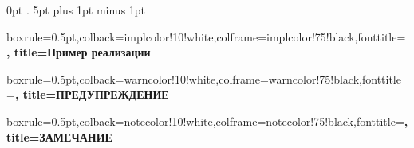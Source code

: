     {\topsep}   %
    {\topsep}   %
    {\itshape}  %
    {0pt}       %
    {\bfseries} %
    {.}         %
    {5pt plus 1pt minus 1pt} %
    {}          %

\theoremstyle{thstyle}

\newtheorem{define}{Определение}[section]
\newtheorem{example}{Пример}[section]


\newenvironment{fig}
{
    \begin{figure}[H]
    \centering
}
{
    \end{figure}
}

\newenvironment{colbox}[1]{%
   \def\FrameCommand{\colorbox{#1}}%
   \MakeFramed{\advance\hsize-\width \FrameRestore}}
 {\endMakeFramed}



{%
    boxrule=0.5pt,colback=implcolor!10!white,colframe=implcolor!75!black,fonttitle=\bfseries,
    title=Пример реализации~\thetcbcounter%
}


{%
    boxrule=0.5pt,colback=warncolor!10!white,colframe=warncolor!75!black,fonttitle=\bfseries,
    title=ПРЕДУПРЕЖДЕНИЕ~\thetcbcounter%
}



{%
    boxrule=0.5pt,colback=notecolor!10!white,colframe=notecolor!75!black,fonttitle=\bfseries,
    title=ЗАМЕЧАНИЕ~\thetcbcounter%
}

\makeindex
